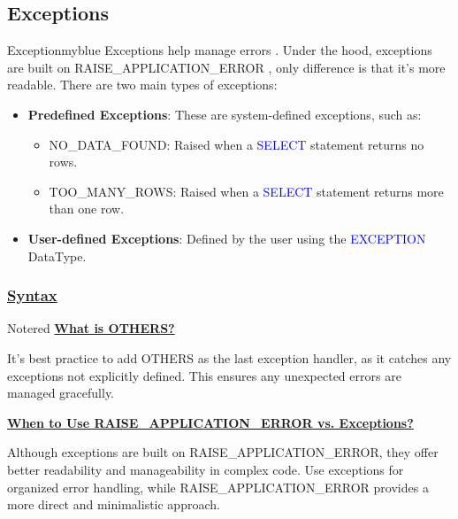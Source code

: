 \vspace{0.5cm}

\subsection{Exceptions}
\begin{prettyBox}{Exception}{myblue}
Exceptions help manage errors . Under
the hood, exceptions are built on RAISE\_APPLICATION\_ERROR ,  only difference is that it's more readable. There are two main types of exceptions:
\begin{itemize}
    \item \textbf{Predefined Exceptions}: These are system-defined exceptions, such as:
        \begin{itemize}
            \item NO\_DATA\_FOUND: Raised when a \textcolor{blue}{SELECT} statement returns no rows.
            \item TOO\_MANY\_ROWS: Raised when a \textcolor{blue}{SELECT} statement returns more than one row.
        \end{itemize}
    \item \textbf{User-defined Exceptions}: Defined by the user using the \textcolor{blue}{EXCEPTION} DataType.
\end{itemize}
\end{prettyBox}

\newpage
\subsubsection*{\underline{Syntax}}







\vspace{0.5cm}
\begin{prettyBox}{Note}{red}
\textbf{\underline{What is OTHERS?}}

\vspace{0.15cm}
It’s best practice to add OTHERS as the last exception handler, as it catches any exceptions not explicitly
defined. This ensures any unexpected errors are managed gracefully.

\vspace{0.25cm}

\textbf{\underline{When to Use RAISE\_APPLICATION\_ERROR vs. Exceptions?}}

\vspace{0.15cm}
Although exceptions are built on RAISE\_APPLICATION\_ERROR, they offer better readability and manageability
in complex code. Use exceptions for organized error handling, while RAISE\_APPLICATION\_ERROR provides a more
direct and minimalistic approach.
\end{prettyBox}


